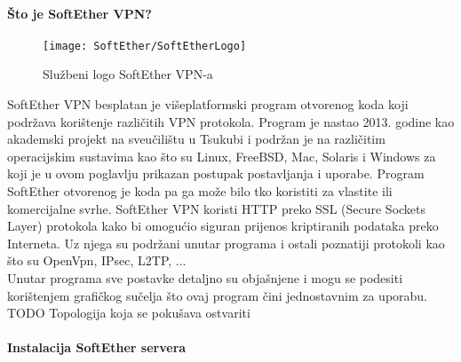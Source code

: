 \bigbreak
\paragraph*{Što je SoftEther VPN?}
\hfill \smallbreak
\begin{wrapfigure}{r}{0.5\textwidth} 
     \centering
     \texttt{[image: SoftEther/SoftEtherLogo]}
	\caption{Službeni logo SoftEther VPN-a}
\end{wrapfigure}

SoftEther VPN\cite{softether} besplatan je višeplatformski program otvorenog koda koji podržava korištenje različitih VPN protokola. Program je nastao 2013. godine kao akademski projekt na sveučilištu u Tsukubi i podržan je na različitim operacijskim sustavima kao što su Linux, FreeBSD, Mac, Solaris i Windows za koji je u ovom poglavlju prikazan postupak postavljanja i uporabe.
\smallbreak
Program SoftEther otvorenog je koda pa ga može bilo tko koristiti za vlastite ili komercijalne svrhe.\smallbreak
SoftEther VPN koristi HTTP preko SSL (Secure Sockets Layer)\cite{ssl}
protokola kako bi omogućio siguran prijenos kriptiranih podataka preko Interneta. Uz njega su podržani unutar programa i ostali poznatiji protokoli kao što su OpenVpn, IPsec, L2TP, ...\\
Unutar programa sve postavke detaljno su objašnjene i mogu se podesiti korištenjem grafičkog sučelja što ovaj program čini jednostavnim za uporabu.\\
TODO Topologija koja se pokušava ostvariti
\FloatBarrier

\bigbreak
\paragraph*{Instalacija SoftEther servera}

